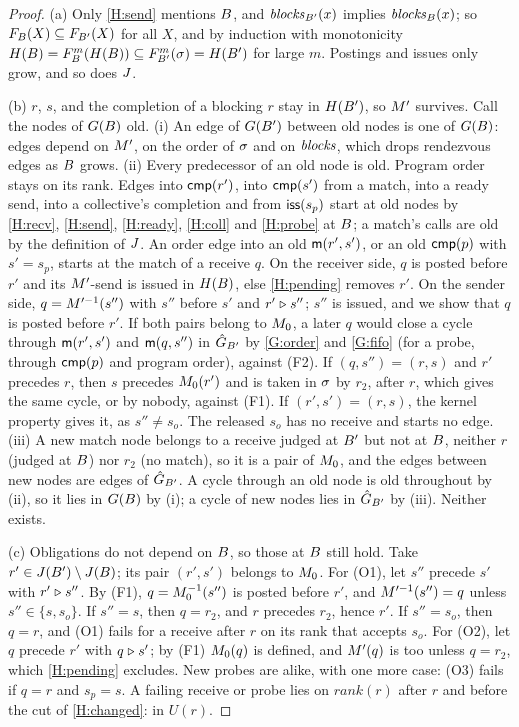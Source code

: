 \begin{proof}
(a) Only \ref{H:send} mentions $B$, and $\mathit{blocks}_{B'}(x)$ implies $\mathit{blocks}_B(x)$; so
$F_B(X)\subseteq F_{B'}(X)$ for all $X$, and by induction with monotonicity
$H(B)=F_B^m(H(B))\subseteq F_{B'}^m(\sigma)=H(B')$ for large $m$. Postings
and issues only grow, and so does $J$.

(b) $r$, $s$, and the completion of a blocking $r$ stay in $H(B')$, so $M'$ survives.
Call the nodes of $G(B)$ old. (i) An edge of $G(B')$ between old nodes is one of
$G(B)$: edges depend on $M'$, on the order of $\sigma$ and on $\mathit{blocks}$, which drops
rendezvous edges as $B$ grows. (ii) Every predecessor of an old node is old. Program order
stays on its rank. Edges into $\mathsf{cmp}(r')$, into $\mathsf{cmp}(s')$ from a match, into a ready send,
into a collective's completion and from $\mathsf{iss}(s_p)$ start at old nodes by \ref{H:recv},
\ref{H:send}, \ref{H:ready}, \ref{H:coll} and \ref{H:probe} at $B$; a match's calls are old
by the definition of $J$. An order edge into an old $\mathsf{m}(r',s')$, or an old $\mathsf{cmp}(p)$
with $s'=s_p$, starts at the match of a receive $q$. On the receiver side, $q$ is posted before
$r'$ and its $M'$-send is issued in $H(B)$, else \ref{H:pending} removes $r'$. On the
sender side, $q=M'^{-1}(s'')$ with $s''$ before $s'$ and $r'\mathrel{\triangleright} s''$; $s''$ is issued,
and we show that $q$ is posted before $r'$. If both pairs belong to $M_0$, a later $q$ would
close a cycle through $\mathsf{m}(r',s')$ and $\mathsf{m}(q,s'')$ in $\hat G_{B'}$ by \ref{G:order}
and \ref{G:fifo} (for a probe, through $\mathsf{cmp}(p)$ and program order), against (F2). If
$(q,s'')=(r,s)$ and $r'$ precedes $r$, then $s$ precedes $M_0(r')$ and is taken in $\sigma$ by
$r_2$, after $r$, which gives the same cycle, or by nobody, against (F1). If $(r',s')=(r,s)$, the
kernel property gives it, as $s''\ne s_o$. The released $s_o$ has no receive and starts no
edge. (iii) A new match node belongs to a
receive judged at $B'$ but not at $B$, neither $r$ (judged at $B$) nor $r_2$ (no match),
so it is a pair of $M_0$, and the edges between new nodes are edges of $\hat G_{B'}$. A cycle
through an old node is old throughout by (ii), so it lies in $G(B)$ by (i); a cycle of
new nodes lies in $\hat G_{B'}$ by (iii). Neither exists.

(c) Obligations do not depend on $B$, so those at $B$ still hold. Take
$r'\in J(B')\setminus J(B)$; its pair $(r',s')$ belongs to $M_0$. For (O1), let
$s''$ precede $s'$ with $r'\mathrel{\triangleright} s''$. By (F1), $q=M_0^{-1}(s'')$ is posted before $r'$,
and $M'^{-1}(s'')=q$ unless $s''\in\{s,s_o\}$. If $s''=s$, then $q=r_2$, and $r$ precedes
$r_2$, hence $r'$. If $s''=s_o$, then $q=r$, and (O1) fails for a receive after $r$ on its rank
that accepts $s_o$. For (O2), let $q$ precede $r'$ with $q\mathrel{\triangleright} s'$; by (F1) $M_0(q)$ is
defined, and $M'(q)$ is too unless $q=r_2$, which \ref{H:pending} excludes. New probes are
alike, with one more case: (O3) fails if $q=r$ and $s_p=s$. A failing receive or probe lies on
$\mathit{rank}(r)$ after $r$ and before the cut of \ref{H:changed}: in $U(r)$.


\end{proof}

